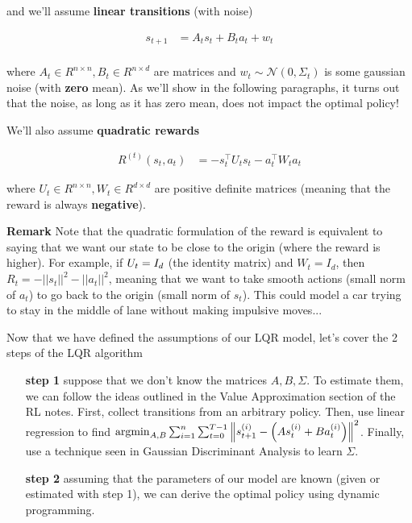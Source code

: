 \documentclass{article}
\begin{document}
and we'll assume \textbf{linear transitions} (with noise)


\begin{align*}
	 s_{t+1} &= A_t s_t + B_t a_t + w_t\\
\end{align*}

where $ A_t \in R^{n \times n}, B_t \in R^{n \times d} $ are matrices and $ w_t \sim \mathcal{N}(0, \Sigma_t)  $ is some gaussian noise (with \textbf{zero} mean). As we'll show in the following paragraphs, it turns out that the noise, as long as it has zero mean, does not impact the optimal policy!

We'll also assume \textbf{quadratic rewards}

\begin{align*}
		R^{(t)}(s_t, a_t)& = - s_t^\top U_t s_t - a_t^\top W_t a_t
\end{align*}

where $ U_t \in R^{n \times n }, W_t \in R^{d \times d}$  are positive definite matrices (meaning that the reward is always \textbf{negative}). 

\vspace{1cm}

\textbf{Remark} Note that the quadratic formulation of the reward is equivalent to saying that we want our state to be close to the origin (where the reward is higher). For example, if $ U_t = I_{{d}} $ (the identity matrix) and $ W_t = I_d $, then $ R_t = - || s_t ||^2 - ||a_t ||^2 $, meaning that we want to take smooth actions (small norm of $ a_t $) to go back to the origin  (small norm of $ s_t $). This could model a car trying to stay in the middle of lane without making impulsive moves...

\vspace{0.5cm}

Now that we have defined the assumptions of our LQR model, let's cover the 2 steps of the LQR algorithm

\begin{enumerate}
	\item[\textbf{step 1}] suppose that we don't know the matrices $ A, B, \Sigma $. To estimate them, we can follow the ideas outlined in the Value Approximation section of the RL notes. First, collect transitions from an arbitrary policy. Then, use linear regression to find $ \operatorname{argmin}_{A,B} \sum_{i=1}^{n} \sum_{t=0}^{T-1} \left\| s^{(i)}_{t+1} - \left(A s^{(i)}_t + B a^{(i)}_t\right) \right\|^2$. Finally, use a technique seen in Gaussian Discriminant Analysis to learn $ \Sigma $.
	\item[\textbf{step 2}] assuming that the parameters of our model are known (given or estimated with step 1), we can derive the optimal policy using dynamic programming.
\end{enumerate}
\end{document}
